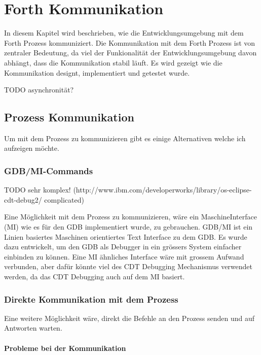 \chapter{Forth Kommunikation}
\label{forthcommunication}

In diesem Kapitel wird beschrieben, wie die Entwicklungsumgebung mit dem Forth Prozess kommuniziert. Die Kommunikation mit dem Forth Prozess ist von zentraler Bedeutung, da viel der Funkionalität der Entwicklungsumgebung davon abhängt, dass die Kommunikation stabil läuft. Es wird gezeigt wie die Kommunikation designt, implementiert und getestet wurde.

TODO asynchronität?


\section{Prozess Kommunikation}
Um mit dem Prozess zu kommunizieren gibt es einige Alternativen welche ich aufzeigen möchte.

\subsection{GDB/MI-Commands}

TODO sehr komplex! (http://www.ibm.com/developerworks/library/os-eclipse-cdt-debug2/ complicated)

Eine Möglichkeit mit dem Prozess zu kommunizieren, wäre ein MaschineInterface (MI) wie es für den GDB implementiert wurde, zu gebrauchen. GDB/MI ist ein Linien basiertes Maschinen orientiertes Text Interface zu dem GDB. Es wurde dazu entwickelt, um den GDB als Debugger in ein grössers System einfacher einbinden zu können.\cite{gdb} Eine MI ähnliches Interface wäre mit grossem Aufwand verbunden, aber dafür könnte viel des CDT Debugging Mechanismus verwendet werden, da das CDT Debugging auch auf dem MI basiert. 

\subsection{Direkte Kommunikation mit dem Prozess}

Eine weitere Möglichkeit wäre, direkt die Befehle an den Prozess senden und auf Antworten warten.

\subsubsection{Probleme bei der Kommunikation}

